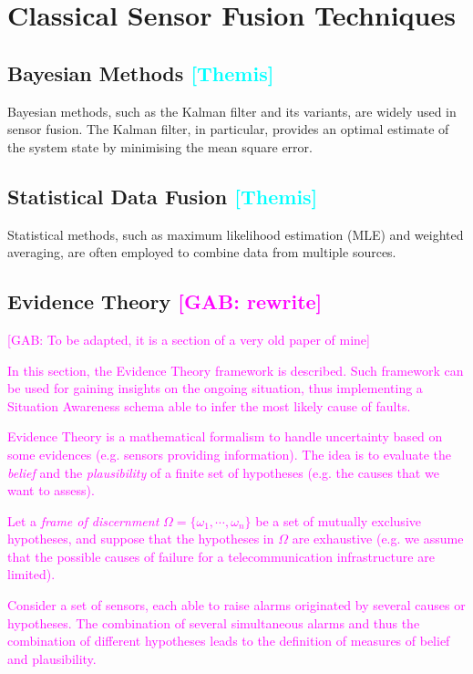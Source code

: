 \documentclass[journal]{IEEEtran}
\newcommand{\GO}[1]{\textcolor{magenta}{{#1}}}
\newcommand{\TC}[1]{\textcolor{cyan}{{#1}}}
\begin{document}
\section{Classical Sensor Fusion Techniques}

\subsection{Bayesian Methods \TC{[Themis]}}
Bayesian methods, such as the Kalman filter and its variants, are widely used in sensor fusion. The Kalman filter, in particular, provides an optimal estimate of the system state by minimising the mean square error.

\subsection{Statistical Data Fusion \TC{[Themis]}} 
Statistical methods, such as maximum likelihood estimation (MLE) and weighted averaging, are often employed to combine data from multiple sources.

\subsection{Evidence Theory \GO{[GAB: rewrite]}}

\GO{[GAB: To be adapted, it is a section of a very old paper of mine]}

\GO{In this section, the Evidence Theory framework is described. Such framework can be used for gaining insights on the ongoing situation, thus implementing a Situation Awareness schema able to infer the most likely cause of faults.}

\GO{Evidence Theory \cite{shafer_mathematical_1976,dempster_upperlower_2008,smets_transferable_1990} is a mathematical formalism to handle uncertainty based on some evidences (e.g. sensors providing information). The idea is to evaluate the \emph{belief} and the \emph{plausibility} of a finite set of hypotheses (e.g. the causes that we want to assess).}

\GO{Let a \textit{frame of discernment} $ \Omega = \{ \omega_1, \cdots, \omega_n\}$ be a set of mutually exclusive hypotheses, and suppose that the hypotheses in $ \Omega$ are exhaustive (e.g. we assume that the possible causes of failure for a telecommunication infrastructure are limited).} 

\GO{Consider a set of sensors, each able to raise alarms originated by several causes or hypotheses. The combination of several simultaneous alarms and thus the combination of different hypotheses leads to the definition of measures of belief and plausibility.}
\end{document}
